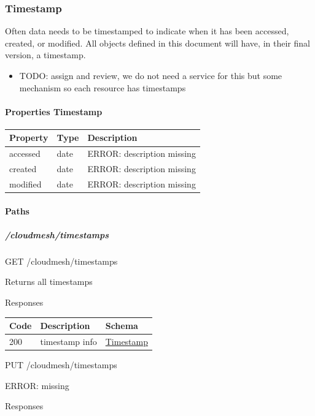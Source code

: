 \documentclass[9pt,]{article}
\providecommand{\tightlist}{%
  \setlength{\itemsep}{0pt}\setlength{\parskip}{0pt}}
\let\oldparagraph\paragraph
\renewcommand{\paragraph}[1]{\oldparagraph{#1}\mbox{}}
\let\oldsubparagraph\subparagraph
\renewcommand{\subparagraph}[1]{\oldsubparagraph{#1}\mbox{}}
\begin{document}
\hypertarget{timestamp}{%
\subsubsection{Timestamp}\label{timestamp}}

Often data needs to be timestamped to indicate when it has been
accessed, created, or modified. All objects defined in this document
will have, in their final version, a timestamp.

\begin{itemize}
\tightlist
\item
  TODO: assign and review, we do not need a service for this but some
  mechanism so each resource has timestamps
\end{itemize}

\hypertarget{properties-timestamp}{%
\paragraph{Properties Timestamp}\label{properties-timestamp}}

\begin{longtable}[]{@{}lll@{}}
\toprule
Property & Type & Description\tabularnewline
\midrule
\endhead
accessed & date & ERROR: description missing\tabularnewline
created & date & ERROR: description missing\tabularnewline
modified & date & ERROR: description missing\tabularnewline
\bottomrule
\end{longtable}

\hypertarget{paths-3}{%
\paragraph{Paths}\label{paths-3}}

\hypertarget{cloudmeshtimestamps}{%
\subparagraph{/cloudmesh/timestamps}\label{cloudmeshtimestamps}}

GET /cloudmesh/timestamps

Returns all timestamps

Responses

\begin{longtable}[]{@{}lll@{}}
\toprule
Code & Description & Schema\tabularnewline
\midrule
\endhead
200 & timestamp info &
\protect\hyperlink{timestamp}{Timestamp}\tabularnewline
\bottomrule
\end{longtable}

PUT /cloudmesh/timestamps

ERROR: missing

Responses
\end{document}
